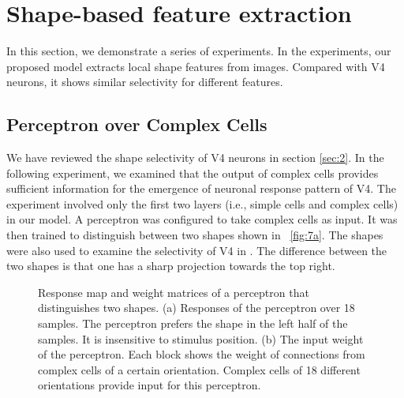 \documentclass[9pt,twocolumn]{article}
\begin{document}
\section{Shape-based feature extraction}\label{sec:4}

In this section, we demonstrate a series of experiments.
In the experiments, our proposed model extracts local shape features from images.
Compared with V4 neurons, it shows similar selectivity for different features.

\subsection{Perceptron over Complex Cells}

We have reviewed the shape selectivity of V4 neurons in section \ref{sec:2}.
In the following experiment, we examined that the output of complex cells provides sufficient information
for the emergence of neuronal response pattern of V4.
The experiment involved only the first two layers (i.e., simple cells and complex cells) in our model.
A perceptron was configured to take complex cells as input.
It was then trained to distinguish between two shapes shown in \figurename~\ref{fig:7a}.
The shapes were also used to examine the selectivity of V4 in \cite{pasupathy2001}.
The difference between the two shapes is that one has a sharp projection towards the top right.

\begin{figure}
\centering
{}\hfil
{}
\caption{Response map and weight matrices of a perceptron that distinguishes two shapes.
(a) Responses of the perceptron over 18 samples.
The perceptron prefers the shape in the left half of the samples.
It is insensitive to stimulus position.
(b) The input weight of the perceptron. 
Each block shows the weight of connections from complex cells of a certain orientation.
Complex cells of 18 different orientations provide input for this perceptron.}
\label{fig:7}
\end{figure}
\end{document}
